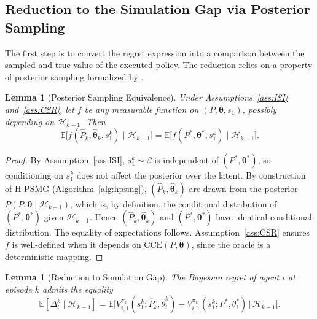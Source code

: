 \documentclass{article}
\newtheorem{lemma}[theorem]{Lemma}
\begin{document}
\subsection{Reduction to the Simulation Gap via Posterior Sampling}

The first step is to convert the regret expression into a comparison between the sampled and true value of the executed policy. The reduction relies on a property of posterior sampling formalized by \citet{russo2014learning,osband2017posterior}.

\begin{lemma}[Posterior Sampling Equivalence]
\label{lem:ps-equivalence}
Under Assumptions~\ref{ass:ISI} and~\ref{ass:CSR}, let $f$ be any measurable function on $(P, \boldsymbol{\theta}, s_1)$, possibly depending on $\mathcal{H}_{k-1}$. Then
\begin{equation}
\mathbb{E}\big[f(\hat{P}_k, \hat{\boldsymbol{\theta}}_k, s_1^k) \mid \mathcal{H}_{k-1}\big] = \mathbb{E}\big[f(P^*, \boldsymbol{\theta}^*, s_1^k) \mid \mathcal{H}_{k-1}\big].
\end{equation}
\end{lemma}

\begin{proof}
By Assumption~\ref{ass:ISI}, $s_1^k \sim \beta$ is independent of $(P^*, \boldsymbol{\theta}^*)$, so conditioning on $s_1^k$ does not affect the posterior over the latent. By construction of H-PSMG (Algorithm~\ref{alg:hpsmg}), $(\hat{P}_k, \hat{\boldsymbol{\theta}}_k)$ are drawn from the posterior $P(P, \boldsymbol{\theta} \mid \mathcal{H}_{k-1})$, which is, by definition, the conditional distribution of $(P^*, \boldsymbol{\theta}^*)$ given $\mathcal{H}_{k-1}$. Hence $(\hat{P}_k, \hat{\boldsymbol{\theta}}_k)$ and $(P^*, \boldsymbol{\theta}^*)$ have identical conditional distribution. The equality of expectations follows. Assumption~\ref{ass:CSR} ensures $f$ is well-defined when it depends on $\mathrm{CCE}(P, \boldsymbol{\theta})$, since the oracle is a deterministic mapping.
\end{proof}

\begin{lemma}[Reduction to Simulation Gap]
\label{lem:reduction}
The Bayesian regret of agent $i$ at episode $k$ admits the equality
\begin{equation}
\label{eq:reduction}
\mathbb{E}[\Delta_i^k \mid \mathcal{H}_{k-1}] = \mathbb{E}\big[V_{i,1}^{\pi_k}(s_1^k; \hat{P}_k, \hat{\theta}_i^k) - V_{i,1}^{\pi_k}(s_1^k; P^*, \theta_i^*) \,\big|\, \mathcal{H}_{k-1}\big].
\end{equation}
\end{lemma}
\end{document}

